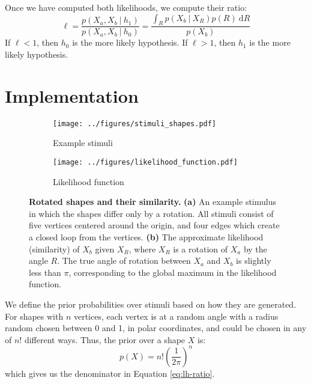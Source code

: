 \documentclass{article} %
\begin{document}
Once we have computed both likelihoods, we compute their ratio:
\begin{equation}
  \ell=\frac{p(X_a, X_b\ \vert \ h_1)}{p(X_a, X_b\ \vert \ h_0)}=\frac{\int_R p(X_b\ \vert\ X_R)p(R)\ \mathrm{d}R}{p(X_b)}
  \label{eq:lh-ratio}
\end{equation}
If $\ell<1$, then $h_0$ is the more likely hypothesis. If $\ell>1$,
then $h_1$ is the more likely hypothesis.

\section{Implementation}


\begin{figure}[t]
  \centering
  \begin{subfigure}[b]{0.45\textwidth}
    \centering
    \texttt{[image: ../figures/stimuli\_shapes.pdf]}
    \vspace{0pt}
    \caption{Example stimuli}
    \label{fig:stimuli}
  \end{subfigure}
  \begin{subfigure}[b]{0.45\textwidth}
    \centering
    \texttt{[image: ../figures/likelihood\_function.pdf]}
    \caption{Likelihood function}
    \label{fig:likelihood}
  \end{subfigure}
  \caption{\textbf{Rotated shapes and their similarity.}  \textbf{(a)}
    An example stimulus in which the shapes differ only by a
    rotation. All stimuli consist of five vertices centered around the
    origin, and four edges which create a closed loop from the
    vertices. \textbf{(b)} The approximate likelihood (similarity) of
    $X_b$ given $X_R$, where $X_R$ is a rotation of $X_a$ by the angle
    $R$. The true angle of rotation between $X_a$ and $X_b$ is
    slightly less than $\pi$, corresponding to the global maximum in
    the likelihood function.}
\end{figure}

We define the prior probabilities over stimuli based on how they are
generated. For shapes with $n$ vertices, each vertex is at a random
angle with a radius random chosen between 0 and 1, in polar
coordinates, and could be chosen in any of $n!$ different ways. Thus,
the prior over a shape $X$ is:
\begin{equation}
  p(X)=n!\left(\frac{1}{2\pi}\right)^n
  \label{eq:prior}
\end{equation} 
which gives us the denominator in Equation \ref{eq:lh-ratio}. 
\end{document}
